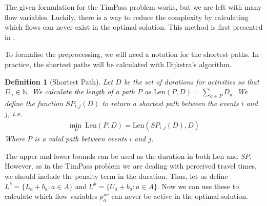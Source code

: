 \documentclass[english, 12pt, a4paper, sci, utf8, a-2b, online]{aaltothesis}
\newtheorem{definition}{Definition}
\newcommand{\N}{\mathbb{N}}
\newcommand{\shortestpath}{\mathit{SP}}
\newcommand{\len}{\textrm{Len}}
\begin{document}

The given formulation for the TimPass problem works, but we are left with many flow variables. Luckily, there is a way to reduce the complexity by calculating which flows can never exist in the optimal solution. This method is first presented in \cite{schiewe2020periodic}. 


To formalise the preprocessing, we will need a notation for the shortest paths. In practice, the shortest paths will be calculated with Dijkstra's algorithm.
\begin{definition}[Shortest Path]
    Let $D$ be the set of durations for activities so that $D_a \in \N$. We calculate the length of a path $P$ as $\len(P, D) = \sum_{a \in P} D_a$. We define the function $\shortestpath_{i,j}(D)$ to return a shortest path between the events $i$ and $j$, i.e. \begin{align}
        \min_P\  \len(P, D) = \len(\shortestpath_{i, j}(D), D)
    \end{align}
    Where $P$ is a valid path between events $i$ and $j$.
\end{definition}


The upper and lower bounds can be used as the duration in both $\len$ and $\shortestpath$. However, as in the TimPass problem we are dealing with perceived travel times, we should include the penalty term in the duration. Thus, let us define $L^b = \{L_a + b_a:a\in A\}$ and $U^b = \{U_a + b_a:a \in A\}$. Now we can use these to calculate which flow variables $p_a^{uv}$ can never be active in the optimal solution.
\end{document}

